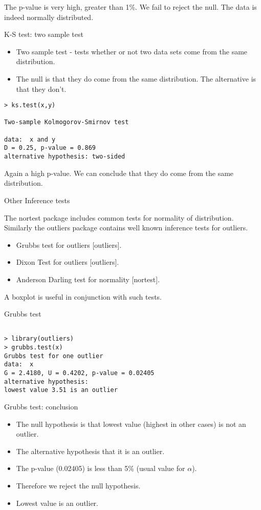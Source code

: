 The p-value is very high, greater than 1\%. We fail to reject the null. The data is indeed normally distributed.


{K-S test: two sample test}

\begin{itemize}
	\item Two sample test - tests whether or not two data sets come from the same distribution.
	\item The null is that they do come from the same distribution. The alternative is that they don't.
\end{itemize}

\begin{verbatim}
> ks.test(x,y)

Two-sample Kolmogorov-Smirnov test

data:  x and y
D = 0.25, p-value = 0.869
alternative hypothesis: two-sided
\end{verbatim}
Again a high p-value. We can conclude that they do come from the same distribution.



{Other Inference tests}

The nortest package includes common tests for normality of distribution. Similarly the outliers package contains well known inference tests for outliers.

\begin{itemize}
	\item Grubbs test for outliers [outliers].
	\item Dixon Test for outliers [outliers].
	\item Anderson Darling test for normality [nortest].
\end{itemize}
A boxplot is useful in conjunction with such tests.




{Grubbs test}
\begin{verbatim}

> library(outliers)
> grubbs.test(x)
Grubbs test for one outlier
data:  x
G = 2.4180, U = 0.4202, p-value = 0.02405
alternative hypothesis:
lowest value 3.51 is an outlier
\end{verbatim}


{Grubbs test: conclusion}
\begin{itemize}
	\item The null hypothesis is that lowest value (highest in other cases) is not an outlier.
	\item The alternative hypothesis that it is an outlier.
	\item The p-value (0.02405) is less than 5\% (usual value for $\alpha$).
	\item Therefore we reject the null hypothesis.
	\item Lowest value is an outlier.
\end{itemize}


